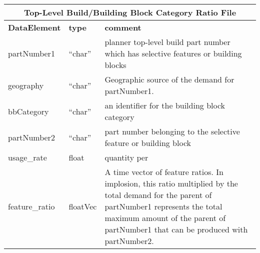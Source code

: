 \vspace{.5in}

\begin{tabular}{llp{4in}}
\multicolumn{3}{c}{{\bf Top-Level Build/Building Block Category Ratio File}}\\ \hline\hline
{\bf DataElement} &  {\bf type}  &   {\bf comment} \\ \hline
partNumber1 &  ``char'' &    planner top-level build part number which has selective features
                             or building blocks \\
geography   &    ``char'' &    Geographic source of the demand for partNumber1. \\
bbCategory &  ``char'' &    an identifier for the building block category  \\
partNumber2 &  ``char''  &   part number belonging to the selective feature or building block  \\
usage\_rate    &    float  &    quantity per \\
feature\_ratio  &   floatVec  &    A time vector of feature ratios.  In implosion, this ratio
                             multiplied by the total demand for the parent of partNumber1
                             represents the total maximum 
                             amount of the parent of partNumber1 that can be 
                             produced with partNumber2. 
\end{tabular}

\vspace{.5in}

